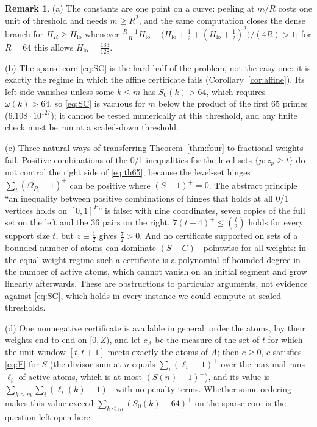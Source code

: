 \documentclass[11pt]{article}
\theoremstyle{definition}
\newtheorem{remark}[theorem]{Remark}
\begin{document}
\begin{remark}
(a) The constants are one point on a curve: peeling at $m/R$ costs one unit of threshold and needs $m\ge R^2$, and the same computation
closes the dense branch for $H_R\ge H_{\mathrm{lo}}$ whenever $\tfrac{R-1}{R}H_{\mathrm{lo}}-\bigl(H_{\mathrm{lo}}+\tfrac12+(H_{\mathrm{lo}}+\tfrac12)^2\bigr)/(4R)>1$;
for $R=64$ this allows $H_{\mathrm{lo}}=\tfrac{133}{128}$.

(b) The sparse core \eqref{eq:SC} is the hard half of the problem, not the easy one: it is exactly the regime in which the affine
certificate fails (Corollary~\ref{cor:affine}). Its left side vanishes unless some $k\le m$ has $S_0(k)>64$, which requires
$\omega(k)>64$, so \eqref{eq:SC} is vacuous for $m$ below the product of the first $65$ primes ($6.108\cdot10^{127}$); it cannot be tested
numerically at this threshold, and any finite check must be run at a scaled-down threshold.

(c) Three natural ways of transferring Theorem~\ref{thm:four} to fractional weights fail. Positive combinations of the 0/1 inequalities
for the level sets $\{p:z_p\ge t\}$ do not control the right side of \eqref{eq:th65}, because the level-set hinges $\sum_t(\Omega_{P_t}-1)^+$
can be positive where $(S-1)^+=0$. The abstract principle ``an inequality between positive combinations of hinges that holds at all
0/1 vertices holds on $[0,1]^P$'' is false: with nine coordinates, seven copies of the full set on the left and the $36$ pairs on the
right, $7(t-4)^+\le\binom t2$ holds for every support size $t$, but $z\equiv\tfrac12$ gives $\tfrac72>0$. And no certificate supported on
sets of a bounded number of atoms can dominate $(S-C)^+$ pointwise for all weights: in the equal-weight regime such a certificate is a
polynomial of bounded degree in the number of active atoms, which cannot vanish on an initial segment and grow linearly afterwards.
These are obstructions to particular arguments, not evidence against \eqref{eq:SC}, which holds in every instance we could compute at
scaled thresholds.

(d) One nonnegative certificate is available in general: order the atoms, lay their weights end to end on $[0,Z)$, and let $c_A$ be the
measure of the set of $t$ for which the unit window $[t,t+1]$ meets exactly the atoms of $A$; then $c\ge0$, $c$ satisfies \eqref{eq:F}
for $S$ (the divisor sum at $n$ equals $\sum_i(\ell_i-1)^+$ over the maximal runs $\ell_i$ of active atoms, which is at most $(S(n)-1)^+$),
and its value is $\sum_{k\le m}\sum_i(\ell_i(k)-1)^+$ with no penalty terms. Whether some ordering makes this value exceed
$\sum_{k\le m}(S_0(k)-64)^+$ on the sparse core is the question left open here.
\end{remark}
\end{document}
